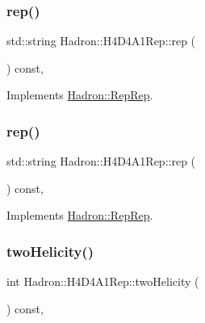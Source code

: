 \subsubsection{\texorpdfstring{rep()}{rep()}\hspace{0.1cm}{\footnotesize\ttfamily [2/3]}}
{\footnotesize\ttfamily std\+::string Hadron\+::\+H4\+D4\+A1\+Rep\+::rep (\begin{DoxyParamCaption}{ }\end{DoxyParamCaption}) const\hspace{0.3cm}{\ttfamily [inline]}, {\ttfamily [virtual]}}



Implements \mbox{\hyperlink{structHadron_1_1RepRep_ab3213025f6de249f7095892109575fde}{Hadron\+::\+Rep\+Rep}}.

\mbox{\label{structHadron_1_1H4D4A1Rep_a5b67fac5b33edc0fa72a93420b2714ca}} 
\subsubsection{\texorpdfstring{rep()}{rep()}\hspace{0.1cm}{\footnotesize\ttfamily [3/3]}}
{\footnotesize\ttfamily std\+::string Hadron\+::\+H4\+D4\+A1\+Rep\+::rep (\begin{DoxyParamCaption}{ }\end{DoxyParamCaption}) const\hspace{0.3cm}{\ttfamily [inline]}, {\ttfamily [virtual]}}



Implements \mbox{\hyperlink{structHadron_1_1RepRep_ab3213025f6de249f7095892109575fde}{Hadron\+::\+Rep\+Rep}}.

\mbox{\label{structHadron_1_1H4D4A1Rep_a67669ae49658ab0d57fd52e138c9dd40}} 
\subsubsection{\texorpdfstring{twoHelicity()}{twoHelicity()}\hspace{0.1cm}{\footnotesize\ttfamily [1/2]}}
{\footnotesize\ttfamily int Hadron\+::\+H4\+D4\+A1\+Rep\+::two\+Helicity (\begin{DoxyParamCaption}{ }\end{DoxyParamCaption}) const\hspace{0.3cm}{\ttfamily [inline]}, {\ttfamily [virtual]}}


